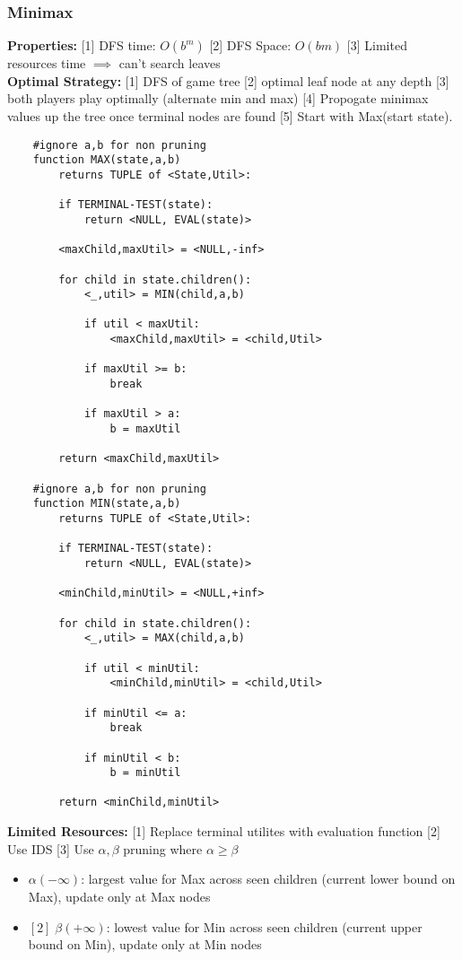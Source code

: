 \subsubsection{Minimax}
\textbf{Properties:} [1] DFS time: $O(b^m)$ [2] DFS Space: $O(bm)$ [3] Limited resources time $\implies$ can't search leaves\\
\textbf{Optimal Strategy:} [1] DFS of game tree [2] optimal leaf node at any depth [3] both players play optimally (alternate min and max) [4] Propogate minimax values up the tree once terminal nodes are found [5] Start with Max(start state).
\begin{lstlisting}
    #ignore a,b for non pruning
    function MAX(state,a,b)
        returns TUPLE of <State,Util>:
        
        if TERMINAL-TEST(state):
            return <NULL, EVAL(state)>

        <maxChild,maxUtil> = <NULL,-inf>

        for child in state.children():
            <_,util> = MIN(child,a,b)

            if util < maxUtil:
                <maxChild,maxUtil> = <child,Util>

            if maxUtil >= b:
                break

            if maxUtil > a:
                b = maxUtil

        return <maxChild,maxUtil>

    #ignore a,b for non pruning
    function MIN(state,a,b)
        returns TUPLE of <State,Util>:
        
        if TERMINAL-TEST(state):
            return <NULL, EVAL(state)>

        <minChild,minUtil> = <NULL,+inf>

        for child in state.children():
            <_,util> = MAX(child,a,b)

            if util < minUtil:
                <minChild,minUtil> = <child,Util>

            if minUtil <= a:
                break

            if minUtil < b:
                b = minUtil

        return <minChild,minUtil>
\end{lstlisting}
\textbf{Limited Resources:} [1] Replace terminal utilites with evaluation function [2] Use IDS [3] Use $\alpha, \beta$ pruning where $\alpha \geq \beta$ 
\begin{itemize}
    \item $\alpha (-\infty)$: largest value for Max across seen children (current lower bound on Max), update only at Max nodes\\
    \item $[2] \;\beta (+\infty)$: lowest value for Min across seen children (current upper bound on Min), update only at Min nodes\\
\end{itemize}
